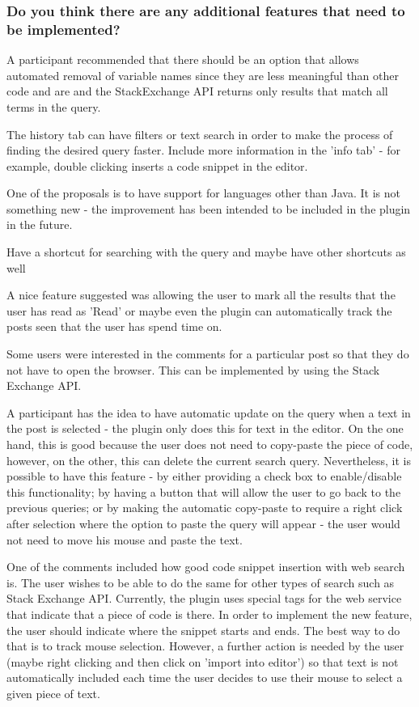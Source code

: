 \documentclass{l4proj}
\begin{document}
\subsubsection{Do you think there are any additional features that need to be implemented?}

A participant recommended that there should be an option that allows automated removal of variable names since they are less meaningful than other code and are and the StackExchange API returns only results that match all terms in the query.

\noindent
The history tab can have filters or text search in order to make the process of finding the desired query faster.
Include more information in the 'info tab' - for example, double clicking inserts a code snippet in the editor.

\noindent
One of the proposals is to have support for languages other than Java. It is not something new - the improvement has been intended to be included in the plugin in the future.

\noindent
Have a shortcut for searching with the query and maybe have other shortcuts as well

\noindent
A nice feature suggested was allowing the user to mark all the results that the user has read as 'Read' or maybe even the plugin can automatically track the posts seen that the user has spend time on.

\noindent
Some users were interested in the comments for a particular post so that they do not have to open the browser. This can be implemented by using the Stack Exchange API.

\noindent
A participant has the idea to have automatic update on the query when a text in the post is selected - the plugin only does this for text in the editor. On the one hand, this is good because the user does not need to copy-paste the piece of code, however, on the other, this can delete the current search query. Nevertheless, it is possible to have this feature - by either providing a check box to enable/disable this functionality; by having a button that will allow the user to go back to the previous queries; or by making the automatic copy-paste to require a right click after selection where the option to paste the query will appear - the user would not need to move his mouse and paste the text.

\noindent
One of the comments included how good code snippet insertion with web search is. The user wishes to be able to do the same for other types of search such as Stack Exchange API. Currently, the plugin uses special tags for the web service that indicate that a piece of code is there. In order to implement the new feature, the user should indicate where the snippet starts and ends. The best way to do that is to track mouse selection. However, a further action is needed by the user (maybe right clicking and then click on 'import into editor') so that text is not automatically included each time the user decides to use their mouse to select a given piece of text. 
\end{document}
